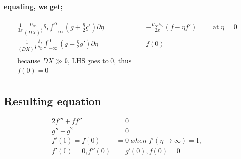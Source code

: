 \documentclass[11pt]{amsart}
\begin{document}
\paragraph{equating, we get;}
\begin{align}
\frac{1}{3x} \frac{U_\infty}{(DX)^\frac{1}{3}} \delta_I \int_{-\infty}^0 (g +\frac{\eta}{2}g') \partial \eta & = - \frac{U_\infty \delta_O}{2x}(f-\eta f') \qquad \text{  at   } \eta=0 \nonumber \\
\frac{1}{(DX)^\frac{1}{3}}\frac{\delta_I}{\delta_O} \int_{-\infty}^0 (g +\frac{\eta}{2}g') \partial \eta & = f(0) \nonumber \\ \nonumber \\
\text{because \(DX \gg 0\), LHS goes to 0, thus} \nonumber \\
f(0) = 0 \nonumber \\ \nonumber
\end{align}
\subsection{Resulting equation} 
\begin{align}
2f''' + ff'' & = 0 \\
g'' - g^2 & = 0 \\
f'(0) = f(0) & = 0 \; when \;  f'(\eta \rightarrow \infty) = 1,  \nonumber \\ \nonumber f'(0) = 0, f''(0) & = g'(0) , f(0) = 0  \\ \nonumber
\end{align}
\end{document}
